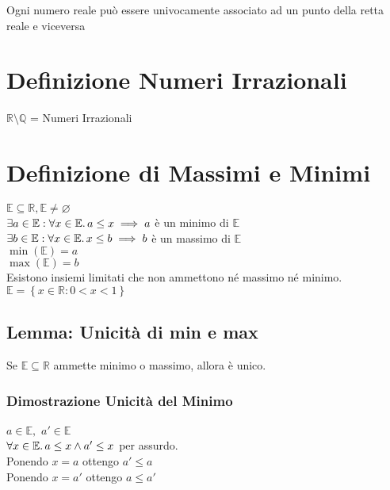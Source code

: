 \documentclass[a4paper, twoside, italian, 11pt]{book}
\newcommand{\braces}[1] {\left \{ #1 \right \}}
\newcommand{\Q}{\mathbb{Q}}
\newcommand{\R}{\mathbb{R}}
\newcommand{\E}{\mathbb{E}}
\let\emptyset\varnothing
\begin{document}
\noindent
Ogni numero reale può essere univocamente associato ad un punto della retta reale e viceversa



\section{Definizione Numeri Irrazionali}

\noindent
$\R \setminus \Q$ = Numeri Irrazionali



\section{Definizione di Massimi e Minimi}

$\E \subseteq \R, \E \neq \emptyset$ \\

$\exists a \in \E : \forall x \in \E \ldotp a \leq x \implies a$ è un minimo di $\E$ \\

$\exists b \in \E : \forall x \in \E \ldotp x \leq b \implies b$ è un massimo di $\E$ \\

$\min(\E) = a$ \\
\indent
$\max(\E) = b$ \\

\noindent
Esistono insiemi limitati che non ammettono né massimo né minimo. \\

$\E = \braces{x \in \R : 0 < x < 1}$


\subsection{Lemma: Unicità di min e max}

Se $\E \subseteq \R$ ammette minimo o massimo, allora è unico.


\subsubsection{Dimostrazione Unicità del Minimo}

\noindent
$a \in \E,$ $a' \in \E$ \\

\noindent
$\forall x \in \E \ldotp a \leq x \land a' \leq x$ per assurdo. \\

\noindent
Ponendo $x = a$ ottengo $a' \leq a$ \\
Ponendo $x = a'$ ottengo $a \leq a'$ \\
\end{document}
